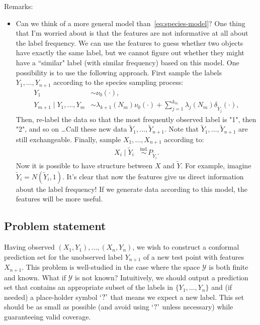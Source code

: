 \documentclass[11pt]{article}
\begin{document}
{\color{red} Remarks:
\begin{itemize}
    \item Can we think of a more general model than~\eqref{eq:species-model}? One thing that I'm worried about is that the features are not informative at all about the label frequency. We can use the features to guess whether two objects have exactly the same label, but we cannot figure out whether they might have a ``similar" label (with similar frequency) based on this model.
    One possibility is to use the following approach. First sample the labels $Y_1,\ldots,Y_{n+1}$ according to the species sampling process:
    \begin{align*}
  Y_1 & \sim \nu_0(\cdot), \\
  Y_{m+1} \mid Y_1, \ldots, Y_m & \sim \lambda_{k+1}(N_m) \nu_0(\cdot) + \sum_{j=1}^{k_m} \lambda_j(N_m) \delta_{\tilde{Y}_j}(\cdot),
\end{align*}
Then, re-label the data so that the most frequently observed label is "1", then "2", and so on \ldots Call these new data $\tilde{Y}_1, \ldots, \tilde{Y}_{n+1}$. Note that $\tilde{Y}_1, \ldots, \tilde{Y}_{n+1}$ are still exchangeable.
Finally, sample $X_1, \ldots, X_{n+1}$ according to:
   \begin{align*}
   X_i \mid \tilde{Y}_i & \overset{\text{ind.}}{\sim} P_{\tilde{Y}_i}.
   \end{align*}
   Now it is possible to have structure between $X$ and $\tilde{Y}$. For example, imagine $\tilde{Y}_i = N(\tilde{Y}_i,1)$. It's clear that now the features give us direct information about the label frequency! If we generate data according to this model, the features will be more useful.
\end{itemize}
}
\subsection{Problem statement}

Having observed $(X_1,Y_1), \ldots, (X_n,Y_n)$, we wish to construct a conformal prediction set for the unobserved label $Y_{n+1}$ of a new test point with features $X_{n+1}$.
This problem is well-studied in the case where the space $\mathcal{Y}$ is both finite and known. What if $\mathcal{Y}$ is not known?
Intuitively, we should output a prediction set that contains an appropriate subset of the labels in $\{Y_1,\ldots,Y_n\}$ and (if needed) a place-holder symbol $`?\textrm'$ that means we expect a new label. This set should be as small as possible (and avoid using $`?\textrm'$ unless necessary) while guaranteeing valid coverage.
\end{document}
